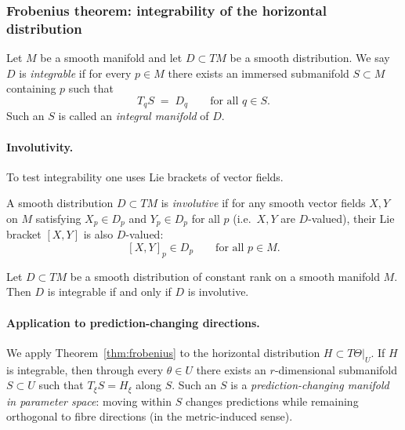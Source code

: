 \subsubsection{Frobenius theorem: integrability of the horizontal distribution}

\begin{gdefn}
\label{def:integrable_distribution}
Let $M$ be a smooth manifold and let $D\subset TM$ be a smooth distribution.
We say $D$ is \emph{integrable} if for every $p\in M$ there exists an immersed submanifold
$S\subset M$ containing $p$ such that
\[
T_q S \;=\; D_q
\qquad\text{for all }q\in S.
\]
Such an $S$ is called an \emph{integral manifold} of $D$.
\end{gdefn}

\paragraph{Involutivity.}
To test integrability one uses Lie brackets of vector fields.

\begin{gdefn}
\label{def:involutive_distribution}
A smooth distribution $D\subset TM$ is \emph{involutive} if for any smooth vector fields
$X,Y$ on $M$ satisfying $X_p\in D_p$ and $Y_p\in D_p$ for all $p$ (i.e.\ $X,Y$ are $D$-valued),
their Lie bracket $[X,Y]$ is also $D$-valued:
\[
[X,Y]_p \in D_p
\qquad\text{for all }p\in M.
\]
\end{gdefn}

\begin{gthm}
\label{thm:frobenius}
Let $D\subset TM$ be a smooth distribution of constant rank on a smooth manifold $M$.
Then $D$ is integrable if and only if $D$ is involutive.
\end{gthm}

\paragraph{Application to prediction-changing directions.}
We apply Theorem~\ref{thm:frobenius} to the horizontal distribution $H\subset T\Theta|_U$.
If $H$ is integrable, then through every $\theta\in U$ there exists an $r$-dimensional
submanifold $S\subset U$ such that $T_\xi S = H_\xi$ along $S$.
Such an $S$ is a \emph{prediction-changing manifold in parameter space}:
moving within $S$ changes predictions while remaining orthogonal to fibre directions (in the
metric-induced sense).

